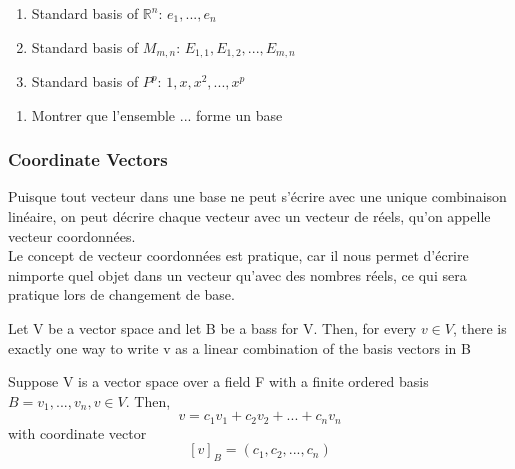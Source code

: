 \documentclass{article}
\begin{document}
\begin{proposition}
    \begin{enumerate}
	\item Standard basis of $\mathbb{R}^n$: ${e_1, ..., e_n} $
	\item Standard basis of $M_{m,n}$: $ {E_{1,1}, E_{1,2}, ...,
	    E_{m,n}} $
	\item Standard basis of $P^p$: ${1,x,x^2, ..., x^p} $
    \end{enumerate}
\end{proposition}

\begin{problem}
    \begin{enumerate}
	\item Montrer que l'ensemble {...} forme un base
    \end{enumerate}
\end{problem}

\subsubsection{Coordinate Vectors}%
\label{ssub:Coordinate Vectors}

\begin{intuition}
    Puisque tout vecteur dans une base ne peut s'écrire avec une
    unique combinaison linéaire, on peut décrire chaque vecteur
    avec un vecteur de réels, qu'on appelle vecteur coordonnées.\\
    Le concept de vecteur coordonnées est pratique, car il nous
    permet d'écrire nimporte quel objet dans un vecteur qu'avec des
    nombres réels, ce qui sera pratique lors de changement de base.\\
\end{intuition}

\begin{theorem}
    Let V be a vector space and let B be a bass for V. Then, for
    every $v \in V$, there is exactly one way to write v as a
    linear combination of the basis vectors in B
\end{theorem}

\begin{definition}
    Suppose V is a vector space over a field F with a finite ordered
    basis $ B= {v_1, ... , v_n}, v \in V$. Then,
    $$ v = c_1 v_1 + c_2 v_2 + ... + c_n v_n $$ with coordinate
    vector $$ [v]_B = (c_1, c_2, ..., c_n)$$
\end{definition}
\end{document}
